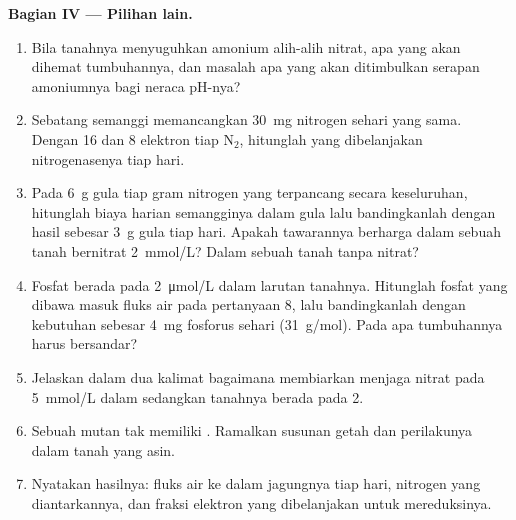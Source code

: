 \begin{problem}
\medskip
\noindent\textbf{Bagian IV --- Pilihan lain.}
\begin{enumerate}[resume]
  \item Bila tanahnya menyuguhkan amonium alih-alih nitrat, apa yang
        akan dihemat tumbuhannya, dan masalah apa yang akan ditimbulkan
        serapan amoniumnya bagi neraca pH-nya?
  \item Sebatang semanggi memancangkan \qty{30}{mg} nitrogen sehari
        yang sama. Dengan \qty{16}{}  dan \qty{8}{} elektron tiap
        $\mathrm{N_2}$, hitunglah  yang dibelanjakan nitrogenasenya
        tiap hari.
  \item Pada \qty{6}{g} gula tiap gram nitrogen yang terpancang secara
        keseluruhan, hitunglah biaya harian semangginya dalam gula lalu
        bandingkanlah dengan hasil sebesar \qty{3}{g} gula tiap hari.
        Apakah tawarannya berharga dalam sebuah tanah bernitrat
        \qty{2}{mmol/L}? Dalam sebuah tanah tanpa nitrat?
  \item Fosfat berada pada \qty{2}{\micro mol/L} dalam larutan tanahnya.
        Hitunglah fosfat yang dibawa masuk fluks air pada pertanyaan 8,
        lalu bandingkanlah dengan kebutuhan sebesar \qty{4}{mg}
        fosforus sehari (\qty{31}{g/mol}). Pada apa tumbuhannya harus
        bersandar?
  \item Jelaskan dalam dua kalimat bagaimana  membiarkan
         menjaga nitrat pada \qty{5}{mmol/L} dalam 
        sedangkan tanahnya berada pada \qty{2}{}.
  \item Sebuah mutan tak memiliki . Ramalkan susunan getah
         dan perilakunya dalam tanah yang asin.
  \item Nyatakan hasilnya: fluks air ke dalam  jagungnya tiap hari,
        nitrogen yang diantarkannya, dan fraksi elektron  yang
        dibelanjakan untuk mereduksinya.
\end{enumerate}
\end{problem}

